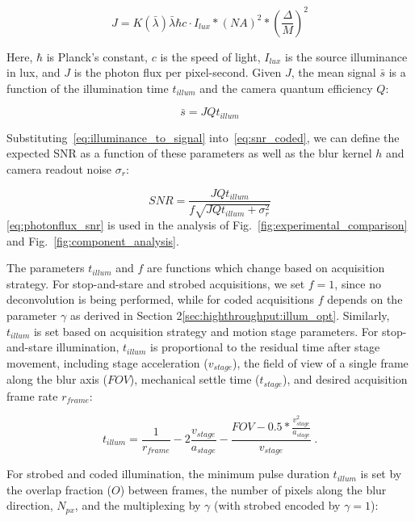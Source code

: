 \begin{equation}
\label{eq:photonflux}
J = K(\bar{\lambda}) \bar{\lambda}\hbar c \cdot I_{lux} * (NA)^2 * (\frac{\Delta}{M})^2
\end{equation}

Here, $\hbar$ is Planck's constant, $c$ is the speed of light, $I_{lux}$ is the source illuminance in lux, and $J$ is the photon flux per pixel-second. Given $J$, the mean signal $\bar{s}$ is a function of the illumination time $t_{illum}$ and the camera quantum efficiency $Q$:

\begin{equation}
\label{eq:illuminance_to_signal}
    \bar{s} = J Q t_{illum}
\end{equation}

Substituting~\eqref{eq:illuminance_to_signal} into~\eqref{eq:snr_coded}, we can define the expected SNR as a function of these parameters as well as the blur kernel $h$ and camera readout noise $\sigma_r$:

\begin{equation}
\label{eq:photonflux_snr}
SNR = \frac{J Q t_{illum}}{f \sqrt{J Q t_{illum} + \sigma_r^2}}
\end{equation}
\eqref{eq:photonflux_snr} is used in the analysis of Fig.~\ref{fig:experimental_comparison} and Fig.~\ref{fig:component_analysis}.

The parameters $t_{illum}$ and $f$ are functions which change based on acquisition strategy. 
For stop-and-stare and strobed acquisitions, we set $f = 1$, since no deconvolution is being performed, while for coded acquisitions $f$ depends on the parameter $\gamma$ as derived in Section 2\ref{sec:highthroughput:illum_opt}. 
Similarly, $t_{illum}$ is set based on acquisition strategy and motion stage parameters. For stop-and-stare illumination, $t_{illum}$ is proportional to the residual time after stage movement, including stage acceleration ($v_{stage}$), the field of view of a single frame along the blur axis ($FOV$), mechanical settle time ($t_{stage}$), and desired acquisition frame rate $r_{frame}$:

\begin{equation}
\label{eq:sns_illum}
t_{illum} = \frac{1}{r_{frame}} - 2\frac{v_{stage}}{a_{stage}} - \frac{FOV - 0.5 * \frac{v_{stage}^2}{a_{stage}}}{v_{stage}}\:.
\end{equation}

For strobed and coded illumination, the minimum pulse duration $t_{illum}$ is set by the overlap fraction ($O$) between frames, the number of pixels along the blur direction, $N_{px}$, and the multiplexing by $\gamma$ (with strobed encoded by $\gamma=1$):

